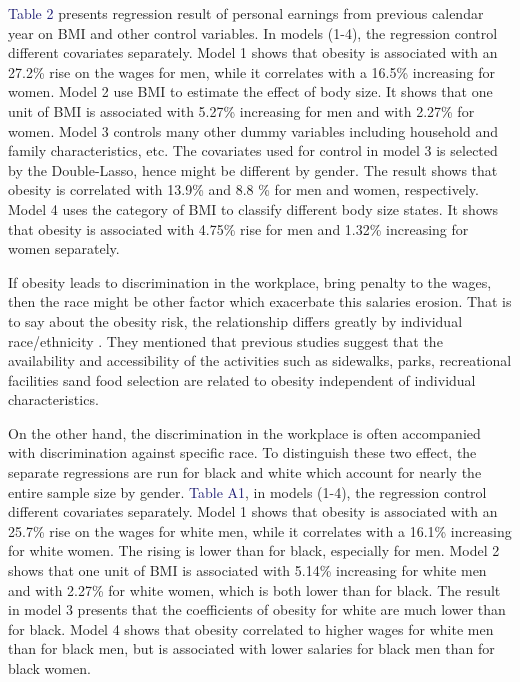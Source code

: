 \documentclass{article}
\begin{document}
\par
\setlength{\parindent}{2em}
\textcolor{MidnightBlue}{Table 2} presents regression result of personal earnings from previous calendar year on BMI and other control variables. In models (1-4), the regression control different covariates separately. Model 1 shows that obesity is associated with an 27.2\% rise on the wages for men, while it correlates with a 16.5\% increasing for women. Model 2 use BMI to estimate the effect of body size. It shows that one unit of BMI is associated with 5.27\% increasing for men and with 2.27\% for women.  Model 3 controls many other dummy variables including household and family characteristics, etc. The covariates used for control in model 3 is selected by the Double-Lasso, hence might be different by gender. The result shows that obesity is correlated with 13.9\% and 8.8 \% for men and women, respectively. Model 4 uses the category of BMI to classify different body size states. It shows that obesity is associated with 4.75\% rise for men and 1.32\% increasing for women separately.


\par
\setlength{\parindent}{2em}
If obesity leads to discrimination in the workplace, bring penalty to the  wages, then the race might be other factor which exacerbate this salaries erosion. That is to say about the obesity risk, the relationship differs greatly by individual race/ethnicity \citep{kirby2012race}. They mentioned that previous studies suggest that the availability and accessibility of the activities such as sidewalks, parks, recreational facilities sand food selection are related to obesity independent of individual characteristics. 


\newpage


\par
\setlength{\parindent}{2em}
On the other hand, the discrimination in the workplace is often accompanied with discrimination against specific race. To distinguish these two effect, the separate regressions are run for black and white which account for nearly the entire sample size by gender. \textcolor{MidnightBlue}{Table A1}, in models (1-4), the regression control different covariates separately. 
Model 1 shows that obesity is associated with an 25.7\% rise on the wages for white men, while it correlates with a 16.1\% increasing for white women. The rising is lower than for black, especially for men. Model 2 shows that one unit of BMI is associated with 5.14\% increasing for white men and with 2.27\% for white women, which is both lower than for black. The result in model 3 presents that the coefficients of obesity for white are much lower than for black. Model 4 shows that obesity correlated to higher wages for white men than for black men, but is associated with lower salaries for black men than for black women.
\end{document}
